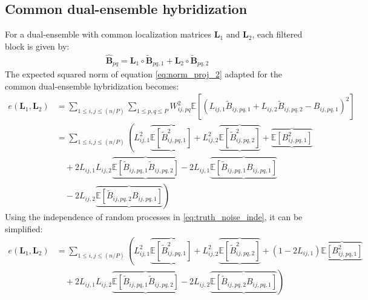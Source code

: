 \documentclass[12pt]{scrartcl}
\begin{document}
\subsection{Common dual-ensemble hybridization}
For a dual-ensemble with common localization matrices $\mathbf{L}_1$ and $\mathbf{L}_2$, each filtered block is given by:
\begin{align}
\widehat{\mathbf{B}}_{pq} = \mathbf{L}_1 \circ \widetilde{\mathbf{B}}_{pq,1} + \mathbf{L}_2 \circ \widetilde{\mathbf{B}}_{pq,2}
\end{align}
The expected squared norm of equation \eqref{eq:norm_proj_2} adapted for the common dual-ensemble hybridization becomes:
\begin{align}
e(\mathbf{L}_1,\mathbf{L}_2) & = \sum_{1 \le i,j \le (n/P)} \sum_{1 \le p,q \le P} W_{ij,pq}^2 \mathbb{E}\left[ \left(L_{ij,1} \widetilde{B}_{ij,pq,1} + L_{ij,2} \widetilde{B}_{ij,pq,2} - B_{ij,pq,1} \right)^2 \right] \nonumber \\
& = \sum_{1 \le i,j \le (n/P)} \left(L_{ij,1}^2 \underbrace{\overbrace{\mathbb{E}\left[\widetilde{B}_{ij,pq,1}^2\right]}} + L_{ij,2}^2 \underbrace{\overbrace{\mathbb{E}\left[\widetilde{B}_{ij,pq,2}^2\right]}} + \underbrace{\overbrace{\mathbb{E} \left[B^2_{ij,pq,1}\right]}} \right. \nonumber \\
& \quad + 2 L_{ij,1} L_{ij,2} \underbrace{\overbrace{\mathbb{E} \left[\widetilde{B}_{ij,pq,1} \widetilde{B}_{ij,pq,2}\right]}} - 2 L_{ij,1} \underbrace{\overbrace{\mathbb{E} \left[\widetilde{B}_{ij,pq,1} B_{ij,pq,1}\right]}} \nonumber \\
& \left. \quad - 2 L_{ij,2} \underbrace{\overbrace{\mathbb{E} \left[\widetilde{B}_{ij,pq,2} B_{ij,pq,1}\right]}}\right)
\end{align}
Using the independence of random processes in \eqref{eq:truth_noise_inde}, it can be simplified:
\begin{align}
e(\mathbf{L}_1,\mathbf{L}_2) & = \sum_{1 \le i,j \le (n/P)} \left(L_{ij,1}^2 \underbrace{\overbrace{\mathbb{E}\left[\widetilde{B}_{ij,pq,1}^2\right]}} + L_{ij,2}^2 \underbrace{\overbrace{\mathbb{E}\left[\widetilde{B}_{ij,pq,2}^2\right]}} + \left(1 - 2 L_{ij,1}\right) \underbrace{\overbrace{\mathbb{E} \left[B^2_{ij,pq,1}\right]}} \right. \nonumber \\
& \left. \quad + 2 L_{ij,1} L_{ij,2} \underbrace{\overbrace{\mathbb{E} \left[\widetilde{B}_{ij,pq,1} \widetilde{B}_{ij,pq,2}\right]}} - 2 L_{ij,2} \underbrace{\overbrace{\mathbb{E} \left[\widetilde{B}_{ij,pq,2} B_{ij,pq,1}\right]}}\right)
\end{align}
\end{document}
